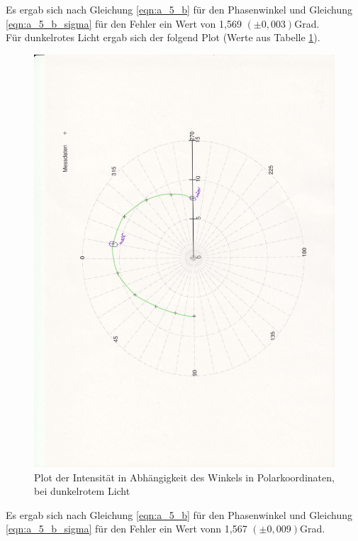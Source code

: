 \documentclass[12pt]{scrartcl}
\begin{document}
\begin{enumerate}
Es ergab sich nach Gleichung \ref{eqn:a_5_b} für den Phasenwinkel und Gleichung \ref{eqn:a_5_b_sigma} für den Fehler ein Wert von 1,569 $(\pm 0,003)$Grad.\\

Für dunkelrotes Licht ergab sich der folgend Plot (Werte aus Tabelle \ref{fig:a_5_dr}).

\begin{figure}[H]
\centering
    \includegraphics[scale = 0.3, angle = -90]{a_5_dr.pdf}
  	\caption[Plot der Intensität in Abhängigkeit des Winkels in Polarkoordinaten, bei dunkelrotem Licht]{Plot der Intensität in Abhängigkeit des Winkels in Polarkoordinaten, bei dunkelrotem Licht}
  \label{fig:a_5_dr}
\end{figure}

Es ergab sich nach Gleichung \ref{eqn:a_5_b} für den Phasenwinkel und Gleichung \ref{eqn:a_5_b_sigma} für den Fehler ein Wert vonn 1,567 $(\pm 0,009)$Grad.\\


\end{enumerate}
\end{document}
